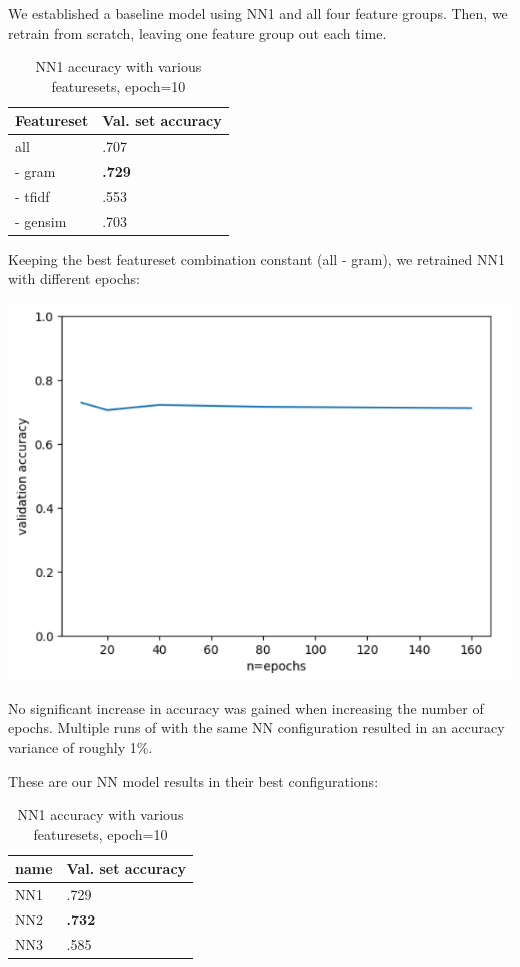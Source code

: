 \documentclass[12pt]{article}
\begin{document}
We established a baseline model using NN1 and all four feature groups. Then, we retrain from scratch, leaving one feature group out each time.
\vskip 0.2in
\begin{table}[h]
  \centering
  \begin{tabular}{|l|l|}
    \hline
    Featureset  & Val. set accuracy \\
    \hline
    all      & .707 \\
      - gram  & \textbf{.729} \\
      - tfidf & .553 \\
      - gensim  & .703 \\
    \hline
  \end{tabular}
  \caption{NN1 accuracy with various featuresets, epoch=10}
  \label{tab:nn1-featuresets}
\end{table}
\vskip 0.2in
Keeping the best featureset combination constant (all - gram), we retrained NN1 with different epochs:


\includegraphics[scale=.45, center]{images/epochs.png}

No significant increase in accuracy was gained when increasing the number of epochs. Multiple runs of with the same NN configuration resulted in an accuracy variance of roughly 1\%.

These are our NN model results in their best configurations:

\begin{table}[h]
  \centering
  \begin{tabular}{|l|l|}
    \hline
    name & Val. set accuracy \\
    \hline
    NN1      & .729 \\
    NN2      & \textbf{.732} \\
    NN3      & .585 \\
    \hline
  \end{tabular}
  \caption{NN1 accuracy with various featuresets, epoch=10}
  \label{tab:nn-results}
\end{table}
\end{document}
